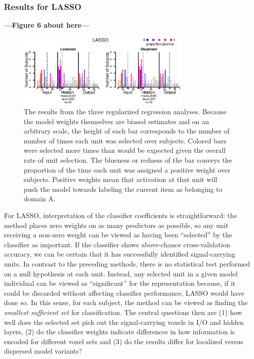 \subsubsection{Results for LASSO}
\textbf{---Figure 6 about here---}
\begin{figure}
\centering
\includegraphics[width=0.75\textwidth]{figures/lasso_only.eps}
\caption{\label{fig.lasso} The results from the three regularized regression analyses. Because the model weights themselves are biased estimates and on an arbitrary scale, the height of each bar corresponds to the number of number of times each unit was selected over subjects. Colored bars were selected more times than would be expected given the overall rate of unit selection. The blueness or redness of the bar conveys the proportion of the time each unit was assigned a positive weight over subjects. Positive weights mean that activation at that unit will push the model towards labeling the current item as belonging to domain A.}
\end{figure}

For LASSO, interpretation of the classifier coefficients is straightforward: the method places zero weights on as many predictors as possible, so any unit receiving a non-zero weight can be viewed as having been ``selected'' by the classifier as important. If the classifier shows above-chance cross-validation accuracy, we can be certain that it has successfully identified signal-carrying units. In contrast to the preceding methods, there is no statistical test performed on a null hypothesis at each unit. Instead, any selected unit in a given model individual can be viewed as ``significant'' for the representation because, if it could be discarded without affecting classifier performance, LASSO would have done so. In this sense, for each subject, the method can be viewed as finding the {\em smallest sufficient set} for classification. The central questions then are (1) how well does the selected set pick out the signal-carrying voxels in I/O and hidden layers, (2) do the classifier weights indicate differences in how information is encoded for different voxel sets and (3) do the results differ for localized versus dispersed model variants?

